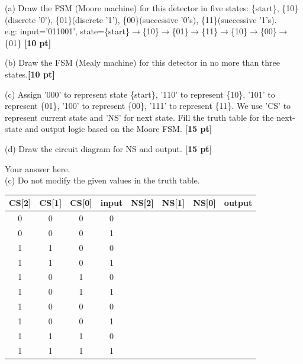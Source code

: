\documentclass[a4paper]{article}
\begin{document}
(a) Draw the FSM (Moore machine) for this detector in five states: \{start\}, \{10\}(discrete '0'), \{01\}(discrete '1'), \{00\}(successive '0's), \{11\}(successive '1's). \\
e.g: input='011001', state=\{start\}$\xrightarrow{}$\{10\}$\xrightarrow{}$\{01\}$\xrightarrow{}$\{11\}$\xrightarrow{}$\{10\}$\xrightarrow{}$\{00\}$\xrightarrow{}$\{01\} \textbf{[10 pt]}

(b) Draw the FSM (Mealy machine) for this detector in no more than three states.\textbf{[10 pt]}

(c) Assign '000' to represent state \{start\}, '110' to represent \{10\}, '101' to represent \{01\}, '100' to represent \{00\}, '111' to represent \{11\}. We use 'CS' to represent current state and 'NS' for next state. Fill the truth table for the next-state and output logic based on the Moore FSM. \textbf{[15 pt]}

(d) Draw the circuit diagram for NS and output. \textbf{[15 pt]}
\begin{answer}[Question 3]
        Your answer here. \\
        (c) Do not modify the given values in the truth table.\\
        \begin{center}
            \begin{tabular}{ |c|c|c|c||c|c|c|c| } 
             \hline
             CS[2] & CS[1] & CS[0] & input & NS[2] & NS[1] & NS[0] & output \\ 
             \hline
             0 & 0 & 0 & 0 &  &  &  &  \\ 
             \hline
             0 & 0 & 0 & 1 &  &  &  &  \\ 
             \hline
             1 & 1 & 0 & 0 &  &  &  &  \\ 
             \hline
             1 & 1 & 0 & 1 &  &  &  &  \\ 
             \hline
             1 & 0 & 1 & 0 &  &  &  &  \\ 
             \hline
             1 & 0 & 1 & 1 &  &  &  &  \\ 
             \hline
             1 & 0 & 0 & 0 &  &  &  &  \\ 
             \hline
             1 & 0 & 0 & 1 &  &  &  &  \\ 
             \hline
             1 & 1 & 1 & 0 &  &  &  &  \\ 
             \hline
             1 & 1 & 1 & 1 &  &  &  &  \\ 
             \hline
            \end{tabular}
        \end{center}
        
\end{answer}
\end{document}
